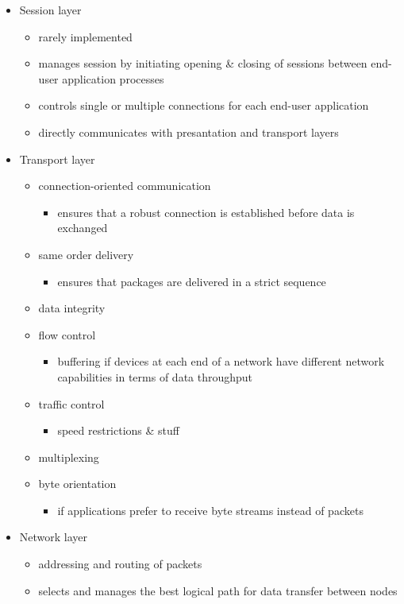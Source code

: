 \documentclass[a4paper,11pt]{article}
\begin{document}
\begin{itemize}
	\item Session layer
	\begin{itemize}
		\item  rarely implemented
		\item  manages session by initiating opening \& closing of sessions between end-user application processes
		\item  controls single or multiple connections for each end-user application
		\item  directly communicates with presantation and transport layers
	\end{itemize}

	\item Transport layer
	\begin{itemize}
		\item  connection-oriented communication
		\begin{itemize}
			\item ensures that a robust connection is established before data is exchanged
		\end{itemize}
		\item  same order delivery
		\begin{itemize}
			\item  ensures that packages are delivered in a strict sequence
		\end{itemize}
		\item  data integrity
		\item  flow control
		\begin{itemize}
			\item  buffering if devices at each end of a network have different network capabilities in terms of data throughput 
		\end{itemize}	
		\item  traffic control
		\begin{itemize}
			\item  speed restrictions \& stuff
		\end{itemize}	
		\item  multiplexing
		\item  byte orientation
		\begin{itemize}
			\item if applications prefer to receive byte streams instead of packets 
		\end{itemize}  
	\end{itemize}

	\item Network layer
	\begin{itemize}
		\item  addressing and routing of packets
		\item  selects and manages the best logical path for data transfer between nodes
	\end{itemize}


\end{itemize}
\end{document}
